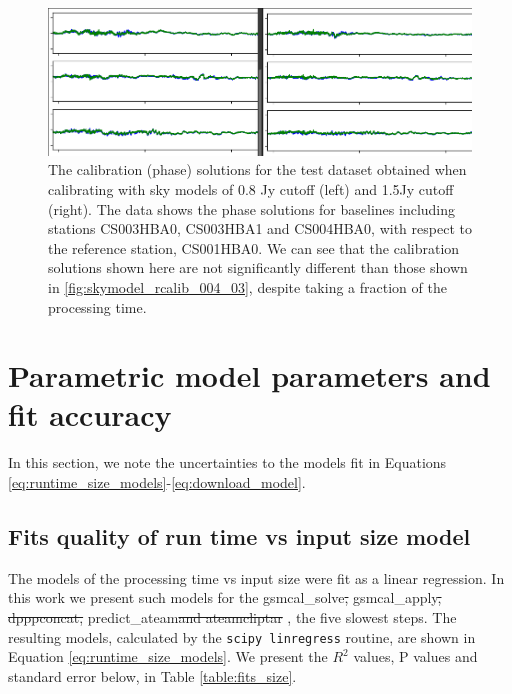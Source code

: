 \documentclass[preprint,5p]{elsarticle}
\providecommand{\DIFadd}[1]{{\protect\color{blue}\uwave{#1}}} %
\providecommand{\DIFdel}[1]{{\protect\color{red}\sout{#1}}}                      %
\providecommand{\DIFaddbegin}{} %
\providecommand{\DIFaddend}{} %
\providecommand{\DIFdelbegin}{} %
\providecommand{\DIFdelend}{} %
\newcommand{\DIFscaledelfig}{0.5}
\newlength{\DIFdelgraphicswidth} %
\newlength{\DIFdelgraphicsheight} %
\newcommand{\DIFaddincludegraphics}[2][]{{\color{blue}\fbox{\DIFOincludegraphics[#1]{#2}}}} %
\newcommand{\DIFdelincludegraphics}[2][]{%
\sbox{\DIFdelgraphicsbox}{\DIFOincludegraphics[#1]{#2}}%
\settoboxwidth{\DIFdelgraphicswidth}{\DIFdelgraphicsbox} %
\settoboxtotalheight{\DIFdelgraphicsheight}{\DIFdelgraphicsbox} %
\scalebox{\DIFscaledelfig}{%
\parbox[b]{\DIFdelgraphicswidth}{\usebox{\DIFdelgraphicsbox}\\[-\baselineskip] \rule{\DIFdelgraphicswidth}{0em}}\llap{\resizebox{\DIFdelgraphicswidth}{\DIFdelgraphicsheight}{%
\setlength{\unitlength}{\DIFdelgraphicswidth}%
\begin{picture}(1,1)%
\thicklines\linethickness{2pt} %
{\color[rgb]{1,0,0}\put(0,0){\framebox(1,1){}}}%
{\color[rgb]{1,0,0}\put(0,0){\line( 1,1){1}}}%
{\color[rgb]{1,0,0}\put(0,1){\line(1,-1){1}}}%
\end{picture}%
}\hspace*{3pt}}} %
} %
\DeclareRobustCommand{\DIFaddbegin}{\DIFOaddbegin \let\includegraphics\DIFaddincludegraphics} %
\DeclareRobustCommand{\DIFaddend}{\DIFOaddend \let\includegraphics\DIFOincludegraphics} %
\DeclareRobustCommand{\DIFdelbegin}{\DIFOdelbegin \let\includegraphics\DIFdelincludegraphics} %
\DeclareRobustCommand{\DIFdelend}{\DIFOaddend \let\includegraphics\DIFOincludegraphics} %
\begin{document}
\begin{figure}
    \includegraphics[width=0.95\linewidth]{figures/08_and_15_solutsions_CS003HBA0_CS003HBA1_CS004HBA0.png}
      \caption{The calibration (phase) solutions for the test dataset obtained when calibrating with sky models of 0.8 Jy cutoff (left) and 1.5Jy cutoff (right). The data shows the phase solutions for baselines including stations CS003HBA0, CS003HBA1 and CS004HBA0, with respect to the reference station, CS001HBA0. We can see that the calibration solutions shown here are not significantly different than those shown in \ref{fig:skymodel_rcalib_004_03}, despite taking a fraction of the processing time.  }
	\label{fig:skymodel_rcalib_08_15}
\end{figure}

\section{Parametric model parameters and fit accuracy}\label{ap:model_params}

In this section, we note the uncertainties to the models fit in Equations \ref{eq:runtime_size_models}-\ref{eq:download_model}. 

\setcounter{equation}{6}
\renewcommand{\theequation}{\Alph{section}.\arabic{equation}}

\subsection{Fits quality of run time vs input size model}

The models of the processing time vs input size were fit as a linear regression. In this work we present such models for the \DIFaddbegin {\selectfont  \DIFaddend gsmcal\_solve\DIFdelbegin \DIFdel{, }\DIFdelend \DIFaddbegin }\DIFadd{, }{\selectfont \DIFaddend gsmcal\_apply\DIFdelbegin \DIFdel{, dpppconcat, }\DIFdelend \DIFaddbegin }\DIFadd{, }{\selectfont \DIFadd{dpppconcat}}\DIFadd{, }{\selectfont \DIFaddend predict\_ateam\DIFdelbegin \DIFdel{and ateamcliptar}\DIFdelend \DIFaddbegin } \DIFadd{and }{\selectfont \DIFadd{ateamcliptar}}\DIFaddend , the five slowest steps. The resulting models, calculated by the \texttt{scipy linregress}\citep{scipy} routine, are shown in Equation \ref{eq:runtime_size_models}. We present the $R^2$ values, P values and standard error below, in Table \ref{table:fits_size}.
\end{document}

